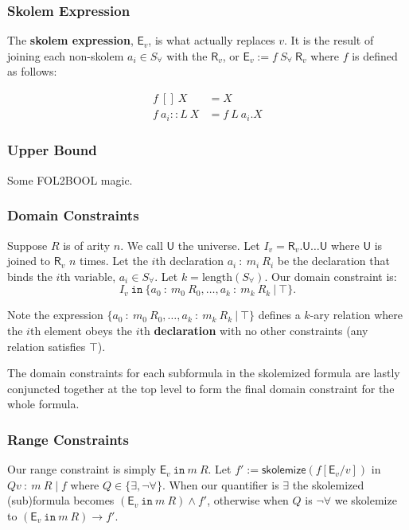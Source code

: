 \documentclass{article}
\theoremstyle{definition}
\begin{document}
    \subsubsection*{Skolem Expression}

    The \textbf{skolem expression}, $\textsf{E}_v$, is what actually replaces $v$. It is the result of joining each non-skolem $a_i \in S_\forall$ with the $\textsf{R}_v$, or $\textsf{E}_v := f~S_\forall~\textsf{R}_v$ where $f$ is defined as follows:
    
    \begin{align*}
        f~[]~X& = X\\
        f~a_i::L~X& = f~L~a_i.X
    \end{align*}

    \subsubsection*{Upper Bound}
    Some FOL2BOOL magic.

    \subsubsection*{Domain Constraints}

    Suppose $R$ is of arity $n$. We call $\textsf{U}$ the universe. Let $I_v = \textsf{R}_v.\textsf{U} \dots \textsf{U}$ where $\textsf{U}$ is joined to $\textsf{R}_v$ $n$ times. Let the $i$th declaration $a_i~:~m_i~R_i$ be the declaration that binds the $i$th variable, $a_i \in S_\forall$. Let $k = \text{length}(S_\forall)$. Our domain constraint is:
    $$I_v ~ \texttt{in} ~ \{a_0~:~m_0~R_0, \dots, a_k~:~m_k~R_k~\vert~\top\}.$$

    Note the expression $\{a_0~:~m_0~R_0, \dots, a_k~:~m_k~R_k~\vert~\top\}$ defines a $k$-ary relation where the $i$th element obeys the $i$th \textbf{declaration} with no other constraints (any relation satisfies $\top$).

    The domain constraints for each subformula in the skolemized formula are lastly conjuncted together at the top level to form the final domain constraint for the whole formula.



    \subsubsection*{Range Constraints}
    Our range constraint is simply $\textsf{E}_v ~\texttt{in}~ m~R$. Let $f' := \textsf{skolemize}(f[\textsf{E}_v / v])$ in $Qv~:~m~R \mid f$ where $Q \in \{\exists, \neg \forall\}$. When our quantifier is $\exists$ the skolemized (sub)formula becomes $(\textsf{E}_v~\texttt{in}~ m~ R) \land f'$, otherwise when $Q$ is $\neg \forall$ we skolemize to $(\textsf{E}_v ~\texttt{in}~ m~R) \to f'$.
\end{document}
